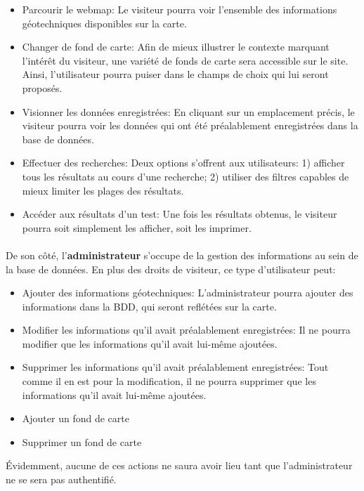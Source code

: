 \begin{itemize}
    \item Parcourir le webmap: Le visiteur pourra voir l'ensemble des informations 
    géotechniques disponibles sur la carte.
    \item Changer de fond de carte: Afin de mieux illustrer le contexte marquant 
    l'intérêt du visiteur, une variété de fonds de carte sera accessible sur le site. 
    Ainsi, l'utilisateur pourra puiser dans le champs de choix qui lui seront proposés.
    \item Visionner les données enregistrées: En cliquant sur un emplacement précis, 
    le visiteur pourra voir les données qui ont été préalablement enregistrées dans la base de données.
    \item Effectuer des recherches: Deux options s'offrent aux utilisateurs: 1) afficher tous les résultats au cours d'une recherche; 2) utiliser 
    des filtres capables de mieux limiter les plages des résultats.
    \item Accéder aux résultats d'un test: Une fois les résultats obtenus, le visiteur 
    pourra soit simplement les afficher, soit les imprimer.
\end{itemize}

\paragraph{}
De son côté, l'\textbf{administrateur} s'occupe de la gestion des informations au sein de la base 
de données. En plus des droits de visiteur, ce type d'utilisateur peut:
\begin{itemize}
    \item Ajouter des informations géotechniques: L'administrateur pourra ajouter des informations 
    dans la BDD, qui seront reflétées sur la carte. 
    \item Modifier les informations qu'il avait préalablement enregistrées: Il ne pourra 
    modifier que les informations qu'il avait lui-même ajoutées.
    \item Supprimer les informations qu'il avait préalablement enregistrées: Tout comme il 
    en est pour la modification, il ne pourra supprimer que les informations qu'il avait lui-même ajoutées.
    \item Ajouter un fond de carte
    \item Supprimer un fond de carte
\end{itemize}

\par 
Évidemment, aucune de ces actions ne saura avoir lieu tant que l'administrateur ne se sera pas authentifié.
